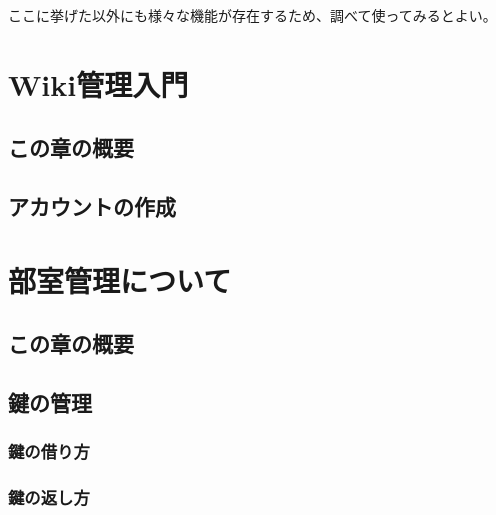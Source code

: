 \documentclass[lualatex,ja=standard,12pt,a4j]{bxjsbook}
\begin{document}
            	ここに挙げた以外にも様々な機能が存在するため、調べて使ってみるとよい。
   \chapter{Wiki管理入門}
		\section{この章の概要}
		\section{アカウントの作成}
	\chapter{部室管理について}
		\section{この章の概要}
		\section{鍵の管理}
		\subsection{鍵の借り方}
		\subsection{鍵の返し方}
\end{document}
